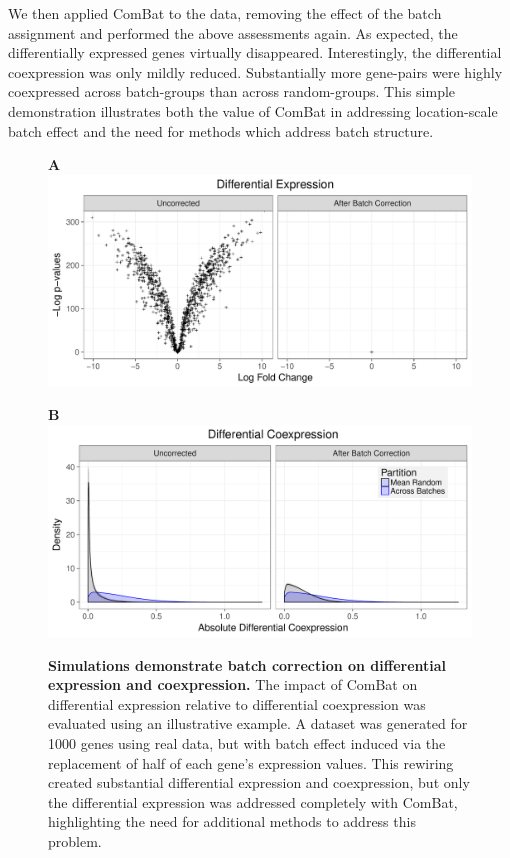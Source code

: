 We then applied ComBat to the data, removing the effect of the batch
assignment and performed the above assessments again. As expected,
the differentially expressed genes virtually disappeared. Interestingly,
the differential coexpression was only mildly reduced. Substantially
more gene-pairs were highly coexpressed across batch-groups than across
random-groups. This simple demonstration illustrates both the value
of ComBat in addressing location-scale batch effect and the need for
methods which address batch structure.

\begin{figure}
\textbf{A}\includegraphics[width=0.9\columnwidth]{figures/demo_diffexpress}

\textbf{B}\includegraphics[width=0.9\columnwidth]{figures/demo_diff_coex_density}
\caption[Simulations demonstrate batch correction on differential expression and coexpression]{\textbf{Simulations demonstrate batch correction on differential expression and coexpression.} The impact of ComBat on differential expression relative to differential
coexpression was evaluated using an illustrative example. A dataset
was generated for 1000 genes using real data, but with batch effect
induced via the replacement of half of each gene's expression values.
This rewiring created substantial differential expression and coexpression,
but only the differential expression was addressed completely with
ComBat, highlighting the need for additional methods to address this
problem.}

\label{demo_plots}

\end{figure}


